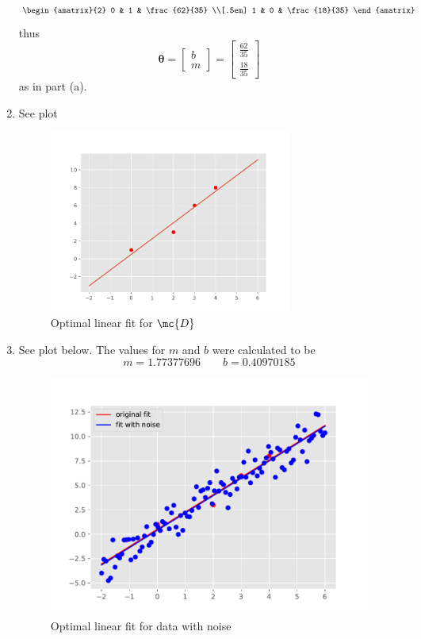 \documentclass[189]{pset}
\begin{document}
\begin{enumerate}
\begin{align*}
        \begin{amatrix}{2}
          0 & 1 & \frac{62}{35} \\[.5em]
          1 & 0 & \frac{18}{35}
        \end{amatrix}
      \end{align*}
      thus
      \[
        \bm{\theta} =
        \begin{bmatrix}
          b \\
          m
        \end{bmatrix}
        =
        \begin{bmatrix}
          \frac{62}{35} \\[.5em]
          \frac{18}{35}
        \end{bmatrix}
      \]
      as in part (a).
    \item See plot
      \begin{figure}[H]
        \centering
        \includegraphics[width=8cm]{hw1pr2c.pdf}
        \caption{Optimal linear fit for $\mc{D}$}
      \end{figure}
    \item See plot below. The values for $m$ and $b$ were calculated
      to be
      \[
        m = 1.77377696 \qquad b = 0.40970185
      \]
      \begin{figure}[H]
        \centering
        \includegraphics{hw1pr2d.pdf}
        \caption{Optimal linear fit for data with noise}
      \end{figure}
  \end{enumerate}
\end{document}
